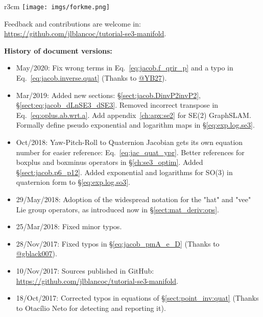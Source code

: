 \documentclass[a4paper,11pt]{report}
\begin{document}
\newpage

\begin{wrapfigure}{r}{3cm}
    \texttt{[image: imgs/forkme.png]}
\end{wrapfigure}

Feedback and contributions are welcome in: \\
\url{https://github.com/jlblancoc/tutorial-se3-manifold}.

\vspace{2cm}

\textbf{History of document versions:}
\begin{itemize}
 \item May/2020: Fix wrong terms in Eq.~\ref{eq:jacob.f_qrir_p} and a typo in Eq.~\ref{eq:jacob.inverse.quat} (Thanks to \href{https://github.com/YB27}{@YB27}).

 \item Mar/2019: Added new sections: \S\ref{sect:jacob.DinvP2invP2}, \S\ref{sect:eq:jacob_dLnSE3_dSE3}. Removed incorrect transpose in Eq.~\ref{eq:oplus.ab.wrt.a}. Add appendix~\ref{ch:apx:se2} for SE(2) GraphSLAM. Formally define pseudo exponential and logarithm maps in \S\ref{eq:exp.log.se3}.

 \item Oct/2018: Yaw-Pitch-Roll to Quaternion Jacobian gets its own equation number for easier reference: Eq.~\ref{eq:jac_quat_ypr}. Better references for boxplus and boxminus operators in \S\ref{ch:se3_optim}. Added \S\ref{sect:jacob.p6_p12}. Added exponential and logarithms for SO(3) in quaternion form to \S\ref{eq:exp.log.so3}.
	
 \item 29/May/2018: Adoption of the widespread notation for the "hat" and "vee" Lie group operators, as introduced now in \S\ref{sect:mat_deriv:ops}.

 \item 25/Mar/2018: Fixed minor typos.
  
 \item 28/Nov/2017: Fixed typos in \S\ref{eq:jacob_pmA_e_D} (Thanks to \href{https://github.com/gblack007}{@gblack007}).

 \item 10/Nov/2017: Sources published in GitHub: \\
    \url{https://github.com/jlblancoc/tutorial-se3-manifold}.

 \item 18/Oct/2017: Corrected typos in equations of \S\ref{sect:point_inv:quat} (Thanks to Otacílio Neto for detecting and reporting it).


\end{itemize}
\end{document}
